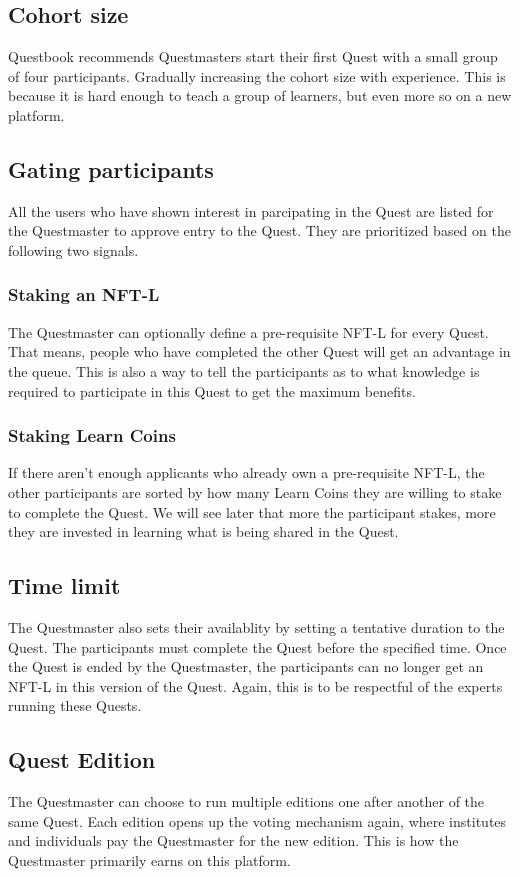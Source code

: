 \documentclass{article}
\begin{document}
    \subsection{Cohort size}
      Questbook recommends Questmasters start their first Quest with a small group of four participants. Gradually increasing the cohort size with experience. 
      This is because it is hard enough to teach a group of learners, but even more so on a new platform.
    \subsection{Gating participants}
      All the users who have shown interest in parcipating in the Quest are listed for the Questmaster to approve entry to the Quest. They are prioritized based on the following two signals.
      \subsubsection{Staking an NFT-L}
        The Questmaster can optionally define a pre-requisite NFT-L for every Quest. That means, people who have completed the other Quest will get an advantage in the queue.
        This is also a way to tell the participants as to what knowledge is required to participate in this Quest to get the maximum benefits. 
      \subsubsection{Staking Learn Coins}
        If there aren't enough applicants who already own a pre-requisite NFT-L, the other participants are sorted by how many Learn Coins they are willing to stake to complete the Quest.
        We will see later that more the participant stakes, more they are invested in learning what is being shared in the Quest.
    \subsection{Time limit}
      The Questmaster also sets their availablity by setting a tentative duration to the Quest. The participants must complete the Quest before the specified time. Once the Quest is ended by the Questmaster, the participants can no longer get an NFT-L in this version of the Quest.
      Again, this is to be respectful of the experts running these Quests. 
    \subsection{Quest Edition}
      The Questmaster can choose to run multiple editions one after another of the same Quest. Each edition opens up the voting mechanism again, where institutes and individuals pay the Questmaster for the new edition. This is how the Questmaster primarily earns on this platform.
\end{document}
